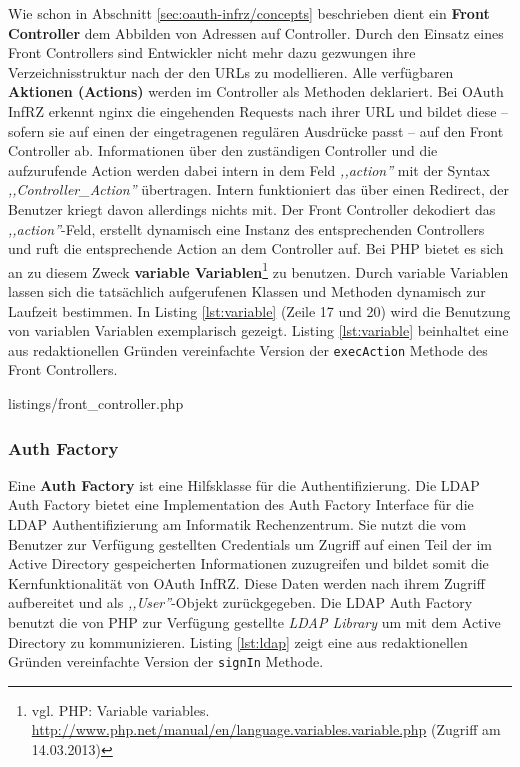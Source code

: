 \documentclass[12pt,a4paper,pointednumbers,abstracton]{scrartcl}
\newcommand{\code}[1]{\small\lstinline[style=InlinePHP]!#1!\normalsize}
\begin{document}
Wie schon in Abschnitt \ref{sec:oauth-infrz/concepts} beschrieben dient ein \textbf{Front Controller} dem Abbilden von Adressen auf Controller.
Durch den Einsatz eines Front Controllers sind Entwickler nicht mehr dazu gezwungen ihre Verzeichnisstruktur nach der den URLs zu modellieren.
Alle verfügbaren \textbf{Aktionen (Actions)} werden im Controller als Methoden deklariert.
Bei OAuth InfRZ erkennt nginx die eingehenden Requests nach ihrer URL und bildet diese -- sofern sie auf einen der eingetragenen regulären Ausdrücke passt -- auf den Front Controller ab.
Informationen über den zuständigen Controller und die aufzurufende Action werden dabei intern in dem Feld \emph{,,action''} mit der Syntax \emph{,,Controller\_Action''} übertragen.
Intern funktioniert das über einen Redirect, der Benutzer kriegt davon allerdings nichts mit.
Der Front Controller dekodiert das \emph{,,action''}-Feld, erstellt dynamisch eine Instanz des entsprechenden Controllers und ruft die entsprechende Action an dem Controller auf.
Bei PHP bietet es sich an zu diesem Zweck \textbf{variable Variablen}\footnote{vgl. PHP: Variable variables. \url{http://www.php.net/manual/en/language.variables.variable.php} (Zugriff am 14.03.2013)} zu benutzen.
Durch variable Variablen lassen sich die tatsächlich aufgerufenen Klassen und Methoden dynamisch zur Laufzeit bestimmen.
In Listing \ref{lst:variable} (Zeile 17 und 20) wird die Benutzung von variablen Variablen exemplarisch gezeigt.
Listing \ref{lst:variable} beinhaltet eine aus redaktionellen Gründen vereinfachte Version der \code{execAction} Methode des Front Controllers.

\begin{minipage}{\textwidth}
	
	{listings/front_controller.php}
\end{minipage}

\subsubsection{Auth Factory}

Eine \textbf{Auth Factory} ist eine Hilfsklasse für die Authentifizierung.
Die LDAP Auth Factory bietet eine Implementation des Auth Factory Interface für die LDAP Authentifizierung am Informatik Rechenzentrum.
Sie nutzt die vom Benutzer zur Verfügung gestellten Credentials um Zugriff auf einen Teil der im Active Directory gespeicherten Informationen zuzugreifen und bildet somit die Kernfunktionalität von OAuth InfRZ.
Diese Daten werden nach ihrem Zugriff aufbereitet und als \emph{,,User''}-Objekt zurückgegeben.
Die LDAP Auth Factory benutzt die von PHP zur Verfügung gestellte \emph{LDAP Library} um mit dem Active Directory zu kommunizieren.
Listing \ref{lst:ldap} zeigt eine aus redaktionellen Gründen vereinfachte Version der \code{signIn} Methode.
\end{document}

